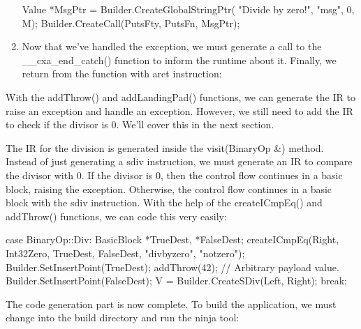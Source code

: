 \begin{enumerate}
\begin{cpp}
    Value *MsgPtr = Builder.CreateGlobalStringPtr(
        "Divide by zero!", "msg", 0, M);
    Builder.CreateCall(PutsFty, PutsFn, {MsgPtr});
\end{cpp}

\item
Now that we’ve handled the exception, we must generate a call to the \_\_cxa\_end\_catch() function to inform the runtime about it. Finally, we return from the function with aret instruction:

\begin{cpp}
    Builder.CreateCall(EndCatchFty, EndCatchFn);
    Builder.CreateRet(Int32Zero);
}
\end{cpp}

\end{enumerate}

With the addThrow() and addLandingPad() functions, we can generate the IR to raise an exception and handle an exception. However, we still need to add the IR to check if the divisor is 0.
We’ll cover this in the next section.



The IR for the division is generated inside the visit(BinaryOp \&) method. Instead of just generating a sdiv instruction, we must generate an IR to compare the divisor with 0. If the divisor is 0, then the control flow continues in a basic block, raising the exception. Otherwise, the control flow continues in a basic block with the sdiv instruction. With the help of the createICmpEq() and addThrow() functions, we can code this very easily:

\begin{cpp}
    case BinaryOp::Div:
        BasicBlock *TrueDest, *FalseDest;
        createICmpEq(Right, Int32Zero, TrueDest,
                     FalseDest, "divbyzero", "notzero");
        Builder.SetInsertPoint(TrueDest);
        addThrow(42); // Arbitrary payload value.
        Builder.SetInsertPoint(FalseDest);
        V = Builder.CreateSDiv(Left, Right);
        break;
\end{cpp}

The code generation part is now complete. To build the application, we must change into the build directory and run the ninja tool:


